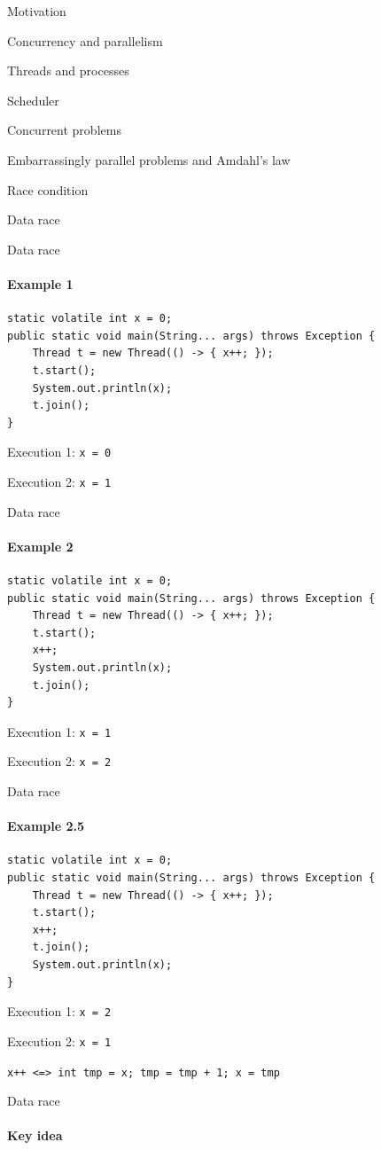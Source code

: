 \begin{section}{Motivation}
\begin{section}{Concurrency and parallelism}
\begin{section}{Threads and processes}
\begin{section}{Scheduler}
\begin{section}{Concurrent problems}
\begin{subsection}{Embarrassingly parallel problems and Amdahl's law}
\begin{subsection}{Race condition}
\begin{subsection}{Data race}
\showTOCSub

\begin{frame}[t,fragile]{Data race}
\framesubtitle{Example 1}

\begin{verbatim}
static volatile int x = 0;
public static void main(String... args) throws Exception {
    Thread t = new Thread(() -> { x++; });
    t.start();
    System.out.println(x);
    t.join();
}
\end{verbatim}

\pause

Execution 1: \texttt{x = 0}

Execution 2: \texttt{x = 1}

\end{frame}

\begin{frame}[t,fragile]{Data race}
\framesubtitle{Example 2}

\begin{verbatim}
static volatile int x = 0;
public static void main(String... args) throws Exception {
    Thread t = new Thread(() -> { x++; });
    t.start();
    x++;
    System.out.println(x);
    t.join();
}
\end{verbatim}

\pause

Execution 1: \texttt{x = 1}

Execution 2: \texttt{x = 2}
\end{frame}


\begin{frame}[t,fragile]{Data race}
\framesubtitle{Example 2.5}

\begin{verbatim}
static volatile int x = 0;
public static void main(String... args) throws Exception {
    Thread t = new Thread(() -> { x++; });
    t.start();
    x++;
    t.join();
    System.out.println(x);
}
\end{verbatim}

\pause
Execution 1: \texttt{x = 2}

\pause 
Execution 2: \texttt{x = 1}

\pause

\texttt{x++ <=> int tmp = x;  tmp = tmp + 1; x = tmp} 

\end{frame}

\begin{frame}{Data race}
\framesubtitle{Key idea}


\end{frame}
\end{subsection}
\end{subsection}
\end{subsection}
\end{section}
\end{section}
\end{section}
\end{section}
\end{section}
